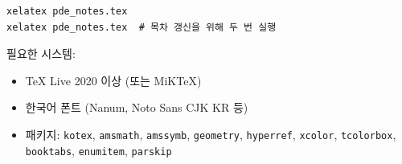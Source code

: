 \documentclass[11pt,a4paper]{article}
\begin{document}
\begin{verbatim}
xelatex pde_notes.tex
xelatex pde_notes.tex  # 목차 갱신을 위해 두 번 실행
\end{verbatim}

필요한 시스템:
\begin{itemize}
\item TeX Live 2020 이상 (또는 MiKTeX)
\item 한국어 폰트 (Nanum, Noto Sans CJK KR 등)
\item 패키지: \texttt{kotex}, \texttt{amsmath}, \texttt{amssymb}, \texttt{geometry}, \texttt{hyperref}, \texttt{xcolor}, \texttt{tcolorbox}, \texttt{booktabs}, \texttt{enumitem}, \texttt{parskip}
\end{itemize}
\end{document}
